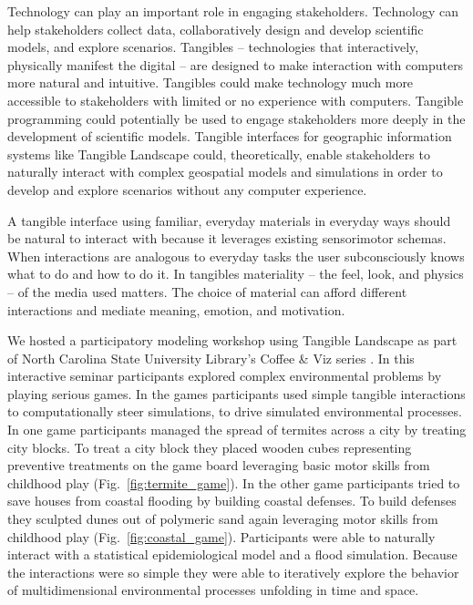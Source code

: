\documentclass{article}
\begin{document}
Technology can play an important role in engaging stakeholders. 
Technology can help stakeholders collect data, 
collaboratively design and develop scientific models, 
and explore scenarios.
%
Tangibles -- technologies that interactively, physically manifest the digital -- are designed to make interaction with computers more natural and intuitive. Tangibles could make technology much more accessible to stakeholders with limited or no experience with computers. 
Tangible programming \citep{Horn2007} could potentially be used to engage stakeholders more deeply in the development of scientific models.  
Tangible interfaces for geographic information systems like Tangible Landscape \citep{Petrasova2015} could, theoretically, 
enable stakeholders to naturally interact with complex geospatial models and simulations in order to develop and explore scenarios without any computer experience. 
%

%
A tangible interface using familiar, everyday materials in everyday ways should be natural to interact with 
because it leverages existing sensorimotor schemas. 
%
When interactions are analogous to everyday tasks 
the user subconsciously knows what to do and how to do it. 
%
In tangibles materiality -- the feel, look, and physics -- of the media used matters. 
The choice of material can afford different interactions
and mediate meaning, emotion, and motivation. 
%



We hosted a participatory modeling workshop using Tangible Landscape 
as part of North Carolina State University Library's Coffee \& Viz series \citep{Harmon2016}. 
%
In this interactive seminar participants 
explored complex environmental problems 
by playing serious games. 
%
In the games
participants used simple tangible interactions 
to computationally steer simulations, 
to drive simulated environmental processes. 
%
In one game participants managed the spread of termites across a city by treating city blocks. 
To treat a city block they placed wooden cubes representing preventive treatments on the game board 
leveraging basic motor skills from childhood play 
(Fig.~\ref{fig:termite_game}).
%
In the other game participants tried to save houses from coastal flooding by building coastal defenses. 
To build defenses they sculpted dunes out of polymeric sand
again leveraging motor skills from childhood play
(Fig.~\ref{fig:coastal_game}). 
%
Participants were able to naturally 
interact with a statistical epidemiological model 
and a flood simulation. 
Because the interactions were so simple %
they were able to iteratively 
explore the behavior of multidimensional environmental processes
unfolding in time and space. 
\end{document}
